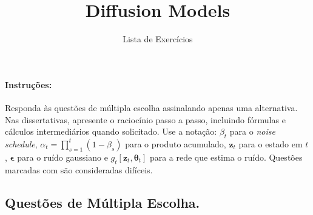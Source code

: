 \documentclass{dlproblemset}
\title{Diffusion Models}
\subtitle{Lista de Exercícios}
\newcommand{\thetav}{\boldsymbol{\theta}}
\begin{document}
\paragraph{Instruções:} Responda às questões de múltipla escolha assinalando apenas uma alternativa. Nas dissertativas, apresente o raciocínio passo a passo, incluindo fórmulas e cálculos intermediários quando solicitado. Use a notação: $\beta_t$ para o \textit{noise schedule}, $\alpha_t = \prod_{s=1}^{t}(1 - \beta_s)$ para o produto acumulado, $\mathbf{z}_t$ para o estado em $t$, $\boldsymbol{\epsilon}$ para o ruído gaussiano e $g_t[\mathbf{z}_t,\thetav_t]$ para a rede que estima o ruído. Questões marcadas com  são consideradas difíceis.

\subsection*{Questões de Múltipla Escolha.}
\end{document}

